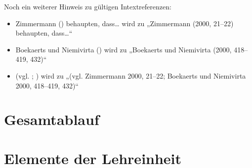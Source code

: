 \documentclass[
          a4paper,
        ]{article}
\providecommand{\tightlist}{%
  \setlength{\itemsep}{0pt}\setlength{\parskip}{0pt}}
\begin{document}
Noch ein weiterer Hinweis zu gültigen Intextreferenzen:

\begin{itemize}
\tightlist
\item
  Zimmermann () behaupten,
  dass\ldots{} wird zu „Zimmermann (2000, 21--22) behaupten,
  dass\ldots{}``
\item
  Boekaerts und Niemivirta () wird zu „Boekaerts und Niemivirta (2000, 418--419,
  432)``
\item
  (vgl. ;
  ) wird zu „(vgl. Zimmermann 2000, 21--22; Boekaerts und Niemivirta
  2000, 418--419, 432)``
\end{itemize}

\hfill\break
\hfill\break
\hfill\break
\hfill\break

\section{Gesamtablauf}\label{gesamtablauf}

\section{Elemente der Lehreinheit}\label{elemente-der-lehreinheit}
\end{document}
